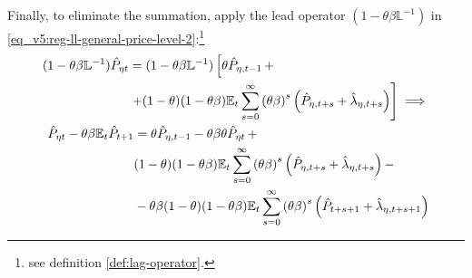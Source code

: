 \documentclass[../thesis.tex]{subfiles}
\begin{document}
Finally, to eliminate the summation, apply the lead operator $(1- \theta \beta \mathbb{L}^{-1})$ in \ref{eq_v5:reg-ll-general-price-level-2}:\footnote{see definition \ref{def:lag-operator}.}
\begin{align}
	\begin{split}
		(1- \theta \beta \mathbb{L}^{-1}) \hat{P}_{\eta t} &= (1- \theta \beta \mathbb{L}^{-1}) \left[ \theta \hat{P}_{\eta, t-1} \, + \right. \\
		&\left. + (1-\theta) (1- \theta \beta) {\mathbb{E}_{t}} \sum_{s=0}^{\infty} \left( \theta \beta \right)^s \left( \hat{P}_{\eta, t+s} + \hat{\lambda}_{\eta, t+s} \right) \right] \implies \nonumber
	\end{split} \\
	\begin{split}
		\hat{P}_{\eta t} - \theta \beta {\mathbb{E}_{t}} \hat{P}_{t+1} &= \theta \hat{P}_{\eta, t-1} - \theta \beta \theta \hat{P}_{\eta t} \, + \\
		& (1-\theta) (1- \theta \beta) {\mathbb{E}_{t}} \sum_{s=0}^{\infty} \left( \theta \beta \right)^s \left( \hat{P}_{\eta, t+s} + \hat{\lambda}_{\eta, t+s} \right) - \\
		& - \theta \beta (1-\theta) (1- \theta \beta) {\mathbb{E}_{t}} \sum_{s=0}^{\infty} \left( \theta \beta \right)^s \left( \hat{P}_{t+s+1} + \hat{\lambda}_{\eta, t+s+1} \right)
	\end{split} \label{eq_v5:reg-ll-general-price-level-3}
\end{align}
\end{document}
